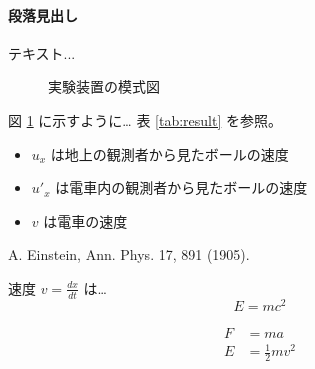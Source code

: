 \documentclass{ltjsarticle}
\begin{document}
\paragraph{段落見出し} テキスト...

\begin{figure}[h]
\centering
\caption{実験装置の模式図}
\label{fig:setup}
\end{figure}

図 \ref{fig:setup} に示すように…
表 \ref{tab:result} を参照。


\begin{itemize}
    \item $u_x$ は地上の観測者から見たボールの速度
    \item $u'_x$ は電車内の観測者から見たボールの速度
    \item $v$ は電車の速度
\end{itemize}

\begin{thebibliography}{9}
 A. Einstein, Ann. Phys. 17, 891 (1905).
\end{thebibliography}

速度 $v = \frac{dx}{dt}$ は…
\[
E = mc^2
\]

\begin{align}
F &= ma \\
E &= \frac{1}{2}mv^2
\end{align}
\end{document}
